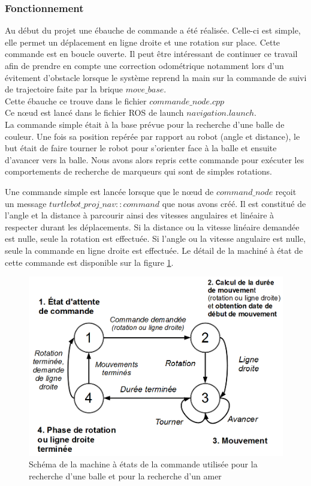\documentclass[10pt,a4paper]{article}
\begin{document}
\subsubsection{Fonctionnement}

Au début du projet une ébauche de commande a été réalisée. Celle-ci est simple, elle permet un déplacement en ligne droite et une rotation sur place. Cette commande est en boucle ouverte. Il peut \^etre intéressant de continuer ce travail afin de prendre en compte une correction odométrique notamment lors d'un évitement d'obstacle lorsque le système reprend la main sur la commande de suivi de trajectoire faite par la brique $move\_base$.\\
Cette ébauche ce trouve dans le fichier $commande\_node.cpp$ \\
Ce nœud est lancé dans le fichier ROS de launch $navigation.launch$.\\

La commande simple était à la base prévue pour la recherche d'une balle de couleur. Une fois sa position repérée par rapport au robot (angle et distance), le but était de faire tourner le robot pour s'orienter face à la balle et ensuite d'avancer vers la balle. Nous avons alors repris cette commande pour exécuter les comportements de recherche de marqueurs qui sont de simples rotations. 

Une commande simple est lancée lorsque que le nœud de $command\_node$ reçoit un message $turtlebot\_proj\_nav::command$ que nous avons créé. Il est constitué de l'angle et la distance à parcourir ainsi des vitesses angulaires et linéaire à respecter durant les déplacements. Si la distance ou la vitesse linéaire demandée est nulle, seule la rotation est effectuée. Si l'angle ou la vitesse angulaire est nulle, seule la commande en ligne droite est effectuée. Le détail de la machiné à état de cette commande est disponible sur la figure \ref{commande_MEF}.

\begin{figure}[!h]
\centering\includegraphics[scale=0.4]{figures/commande_MEF.png}
\caption{Schéma de la machine à états de la commande utilisée pour la recherche d'une balle et pour la recherche d'un amer}
\label{commande_MEF}
\end{figure}
\end{document}
